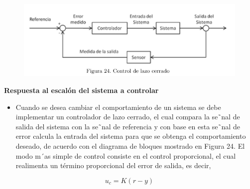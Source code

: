 \begin{figure}[H]
	\centering
	\includegraphics[scale=0.7]{img2/fig24}
	\label{fig:fig24}
\end{figure}

\textbf{Respuesta al escalón del sistema a controlar}

\begin{itemize}
	\item Cuando se desea cambiar el comportamiento de un sistema se debe implementar un controlador de lazo
	cerrado, el cual compara la se˜nal de salida del sistema con la se˜nal de referencia y con base en esta se˜nal
	de error calcula la entrada del sistema para que se obtenga el comportamiento deseado, de acuerdo con
	el diagrama de bloques mostrado en Figura 24. El modo m´as simple de control consiste en el control
	proporcional, el cual realimenta un término proporcional del error de salida, es decir,
\end{itemize}

\begin{equation*}
	u_c=K(r-y)
\end{equation*}

